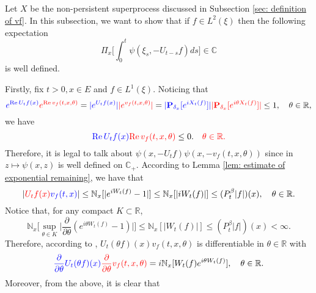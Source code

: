 \documentclass[12pt,oneside,english]{amsart}
\theoremstyle{plain}
\theoremstyle{definition}
\numberwithin{equation}{section}
\newcommand{\added}[1]{{\color{blue}#1}}\newcommand{\deleted}[1]{{\color{red}#1}}
\begin{document}
\subsection{}
\deleted{
    Let $X$ be the non-persistent superprocess discussed in Subsection \ref{sec: definition of vf}.
    In this subsection, we want to show that if $f\in L^2(\xi)$ then the following expectation
\[
    \Pi_x\Big[\int_0^t \psi(\xi_s,- U_{t-s}f)ds\Big]
    \in \mathbb C
\]
    is well defined.
}

    Firstly, fix $t > 0,x\in E$ and $f\in L^1(\xi)$.
    Noticing that
\[
    \added{ e^{\operatorname{Re} U_tf(x)}}
    \deleted{ e^{\operatorname{Re} v_f(t,x,\theta)}}
    = \added{|e^{U_tf(x)}|}
    \deleted{ |e^{v_f(t,x,\theta)}|}
    = \added{|\mathbf P_{\delta_x}[e^{i X_t(f)}]|}
    \deleted{|\mathbf P_{\delta_x}[e^{i\theta X_t(f)}]|}
    \leq 1,
    \quad \theta\in \mathbb R,
\]
    we have
\begin{equation}
\label{eq: -v has positive real part}
    \added{ \operatorname{Re} U_tf(x)}
    \deleted{ \operatorname{Re} v_f(t,x,\theta)}
    \leq 0.
    \deleted{\quad \theta \in \mathbb R.}
\end{equation}
    Therefore, it is legal to talk about \added{$\psi(x,-U_tf)$}\deleted{$\psi(x,-v_f(t,x,\theta))$} since \deleted{in} $z\mapsto \psi(x,z)$ is well defined on $\mathbb C_+$.
    According to Lemma \ref{lem: estimate of exponential remaining}, we have that
\begin{equation}
\label{eq: upper bound for vf}
    |\deleted{U_tf(x)}\added{ v_f(t,x)}| \leq \mathbb N_x[|e^{i W_t(f)} - 1|]
    \leq \mathbb N_x[|i W_t(f)|]
    \leq (P^\beta_t |f|)(x),
    \quad \theta \in \mathbb R.
\end{equation}
    Notice that, for any compact $K \subset \mathbb R$,
\begin{equation}
\label{eq: estimate of deriavetive of v(theta)}
    \mathbb N_x\Big[\sup_{\theta \in K} \Big|\frac{\partial}{\partial \theta} (e^{i\theta W_t(f)} - 1) \Big|\Big]
    \leq \mathbb N_x[|W_t(f)|] \leq (P^\beta_t |f|)(x) < \infty.
\end{equation}
    Therefore, according to \cite[Theorem A.5.2.]{Durrett2010Probability},
    \added{$U_t(\theta f)(x)$}\deleted{$v_f(t,x,\theta)$} is differentiable in $\theta \in \mathbb R$ with
\[
    \added{\frac{\partial}{\partial \theta} U_t(\theta f)(x)}
    \deleted{\frac{\partial}{\partial \theta} v_f(t,x,\theta)}
    = i\mathbb N_x[W_t(f)e^{i\theta W_t(f)}],
    \quad \theta \in \mathbb R.
\]
    Moreover, from the above, it is clear that
\end{document}
